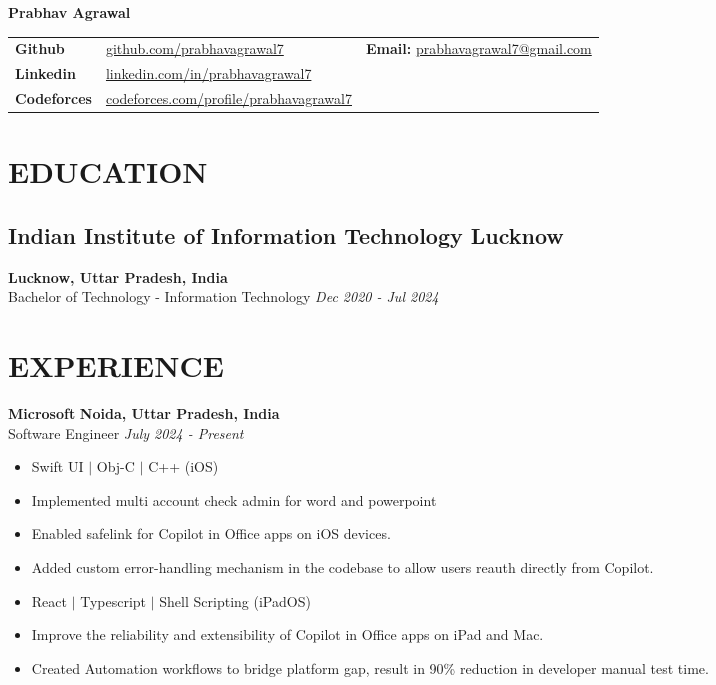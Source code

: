 \documentclass[12pt]{article}
\begin{document}
{\LARGE\textbf{Prabhav Agrawal}} \\
\vspace*{10pt}

\noindent
\begin{tabularx}{\textwidth}{@{}l X r }
			\textbf{Github} & \href{https://github.com/prabhavagrawal7}{github.com/prabhavagrawal7} & \textbf{Email:} \href{mailto:prabhavagrawal7@gmail.com}{prabhavagrawal7@gmail.com} \\
			\textbf{Linkedin} & \href{https://linkedin.com/in/prabhavagrawal7}{linkedin.com/in/prabhavagrawal7} \\
	\textbf{Codeforces} & \href{https://codeforces.com/profile/prabhavagrawal7}{codeforces.com/profile/prabhavagrawal7} & \\
\end{tabularx}
	
\section*{EDUCATION}
\subsection*{Indian Institute of Information Technology Lucknow}	\hfill\textbf{Lucknow, Uttar Pradesh, India} \\
Bachelor of Technology - Information Technology 	\hfill\textit{Dec 2020 -  Jul 2024} \\

\section*{EXPERIENCE}
\textbf{Microsoft} \hfill \textbf{Noida, Uttar Pradesh, India} \\
Software Engineer  \hfill \textit{July 2024 - Present} \\
\begin{itemize}[topsep=1pt, itemsep=1.5pt, partopsep=1pt, parsep=1pt]
	\item Swift UI $|$ Obj-C $|$ C++ (iOS)
	\item Implemented multi account check admin for word and powerpoint
	\item Enabled safelink for Copilot in Office apps on iOS devices.
	\item Added custom error-handling mechanism in the codebase to allow users reauth directly from Copilot.
	\item React $|$ Typescript $|$ Shell Scripting (iPadOS)
	\item Improve the reliability and extensibility of Copilot in Office apps on iPad and Mac.
	\item Created Automation workflows to bridge platform gap, result in 90\% reduction in developer manual test time.
\end{itemize}
\end{document}
